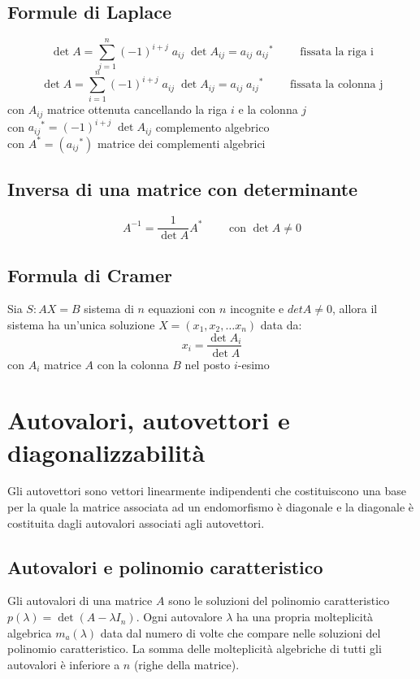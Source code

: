 \documentclass[a4paper]{article}
\begin{document}
\subsection{Formule di Laplace}
\[\det A = \sum_{j=1}^{n} (-1)^{i+j} \; a_{ij} \; \det A_{ij} = a_{ij} \; {a_{ij}}^* \qquad \text{ fissata la riga i}\]
\[\det A = \sum_{i=1}^{n} (-1)^{i+j} \; a_{ij} \; \det A_{ij} = a_{ij} \; {a_{ij}}^* \qquad \text{ fissata la colonna j}\]
con \(A_{ij}\) matrice ottenuta cancellando la riga \(i\) e la colonna \(j\) \\
con \({a_{ij}}^* = (-1)^{i+j} \; \det A_{ij}\) complemento algebrico \\
con \(A^* = \left( {a_{ij}}^* \right)\) matrice dei complementi algebrici

\subsection{Inversa di una matrice con determinante}
\[A^{-1} = \frac{1}{\det A} A^* \qquad \text{ con } \det A \neq 0\]

\subsection{Formula di Cramer}
Sia \(S: AX = B\) sistema di \(n\) equazioni con \(n\) incognite e \(det A \neq 0\), allora il sistema ha un'unica soluzione \(X = (x_1, x_2, \dots x_n)\)
data da: \[x_i = \frac{\det A_i}{\det A}\] con \(A_i\) matrice \(A\) con la colonna \(B\) nel posto \(i\)-esimo

\newpage


\section{Autovalori, autovettori e diagonalizzabilità}
Gli autovettori sono vettori linearmente indipendenti che costituiscono una base per la quale la matrice associata ad un endomorfismo
è diagonale e la diagonale è costituita dagli autovalori associati agli autovettori.

\subsection{Autovalori e polinomio caratteristico}
Gli autovalori di una matrice \(A\) sono le soluzioni del polinomio caratteristico \(p(\lambda) = \det (A - \lambda I_n)\). Ogni
autovalore \(\lambda\) ha una propria molteplicità algebrica \(m_a(\lambda)\) data dal numero di volte che compare nelle soluzioni
del polinomio caratteristico. La somma delle molteplicità algebriche di tutti gli autovalori è inferiore a \(n\) (righe della matrice).
\end{document}
